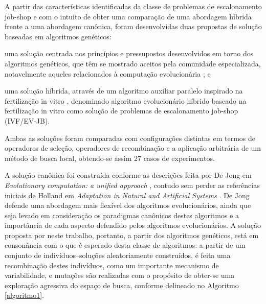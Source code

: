 \documentclass[relatorio,nocolorlinks]{inf-ufg}
\begin{document}
A partir das caracter\'{i}sticas identificadas da classe de problemas de escalonamento job-shop e com o intuito de obter uma compara\c{c}\~{a}o
de uma abordagem h\'{i}brida frente a uma abordagem can\^{o}nica, foram desenvolvidas duas propostas de solu\c{c}\~{a}o baseadas em algoritmos
gen\'{e}ticos:
\begin{inparaenum}
\item uma solu\c{c}\~{a}o centrada nos princ\'{i}pios e pressupostos desenvolvidos em torno dos algoritmos gen\'{e}ticos, que t\^{e}m se mostrado
aceitos pela comunidade especializada, notavelmente aqueles relacionados \`{a} computa\c{c}\~{a}o evolucion\'{a}ria \cite{DeJong2006}; e
\item uma solu\c{c}\~{a}o h\'{i}brida, atrav\'{e}s de um algoritmo auxiliar paralelo inspirado na fertiliza\c{c}\~{a}o in vitro \cite{Camilo2011},
denominado algoritmo evolucion\'{a}rio h\'{i}brido baseado na fertiliza\c{c}\~{a}o in vitro como solu\c{c}\~{a}o de problemas de escalonamento
job-shop (IVF/EV-JB).
\end{inparaenum}
Ambas as solu\c{c}\~{o}es foram comparadas com configura\c{c}\~{o}es distintas em termos de operadores de sele\c{c}\~{a}o, operadores de
recombina\c{c}\~{a}o e a aplica\c{c}\~{a}o arbitr\'{a}ria de um m\'{e}todo de busca local, obtendo-se assim 27 casos de experimentos.

A solu\c{c}\~{a}o can\^{o}nica foi constru\'{i}da conforme as descri\c{c}\~{o}es feita por De Jong em \textit{Evolutionary computation: a unified
approach} \cite{DeJong2006}, contudo sem perder as refer\^{e}ncias iniciais de Holland em \textit{Adaptation in Natural and Artificial Systems}
\cite{Holland1992}. De Jong defende uma abordagem mais flex\'{i}vel dos algoritmos evolucion\'{a}rios, ainda que seja levado em considera\c{c}\~{a}o
os paradigmas can\^{o}nicos destes algoritmos e a import\^{a}ncia de cada aspecto defendido pelos algoritmos evolucion\'{a}rios. A solu\c{c}\~{a}o
proposta por neste trabalho, portanto, a partir dos algoritmos gen\'{e}ticos, est\'{a} em conson\^{a}ncia com o que \'{e} esperado desta classe
de algoritmos: a partir de um conjunto de indiv\'{i}duos--solu\c{c}\~{o}es aleatoriamente constru\'{i}dos, \'{e} feita uma recombina\c{c}\~{a}o
destes indiv\'{i}duos, como um importante mecanismo de variabilidade, e muta\c{c}\~{o}es s\~{a}o realizadas com o prop\'{o}sito de obter-se uma
explora\c{c}\~{a}o agressiva do espa\c{c}o de busca, conforme delineado no Algoritmo \ref{algoritmo1}.
\end{document}
